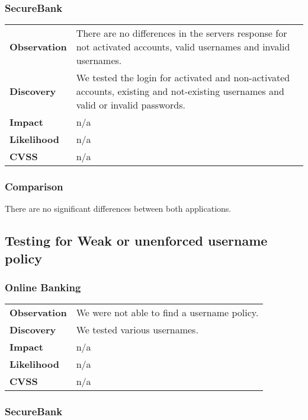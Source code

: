 \subsubsection*{SecureBank}

\begin{tabular}{l|p{10cm}}

\textbf{Observation} & There are no differences in the servers response for not activated accounts, valid usernames and invalid usernames.  \\
\textbf{Discovery} & We tested the login for activated and non-activated accounts, existing and not-existing usernames and valid or invalid passwords. \\
\textbf{Impact} & n/a \\
\textbf{Likelihood} & n/a \\
\textbf{CVSS} & n/a \\
\end{tabular}

\subsubsection*{Comparison}
There are no significant differences between both applications.

\clearpage


\subsection{Testing for Weak or unenforced username policy}

\subsubsection*{Online Banking}

\begin{tabular}{l|p{10cm}}

\textbf{Observation} & We were not able to find a username policy.  \\
\textbf{Discovery} & We tested various usernames. \\
\textbf{Impact} & n/a \\
\textbf{Likelihood} & n/a \\
\textbf{CVSS} & n/a \\
\end{tabular}

\subsubsection*{SecureBank}

